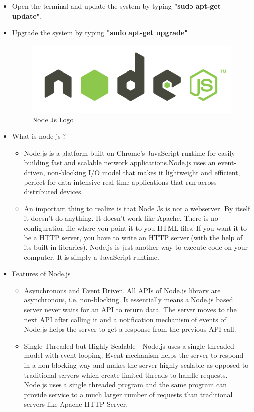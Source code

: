 \documentclass[11pt,a4paper]{article}
\begin{document}
\begin{itemize}
	
	\item Open the terminal and update the system by typing 
	 \textbf{"sudo apt-get update"}.
	 \item Upgrade the system by typing \textbf{ "sudo apt-get upgrade"}
	 \newpage
	 \begin{figure}[h]
    \centering
	\includegraphics[scale=0.5]{nodejs.png}
	\caption {Node Js Logo}
	\end{figure}
	 \item What is node js ?
	 	\begin{itemize}
	 	\item Node.js is a platform built on Chrome's JavaScript runtime for easily building fast and scalable network applications.Node.js uses an event-driven, non-blocking I/O model that makes it lightweight and efficient, perfect for data-intensive real-time applications that run across distributed devices.
	 	\item An important thing to realize is that Node Js is not a webserver. By itself it doesn't do anything. It doesn't work like Apache. There is no configuration file where you point it to you HTML files. If you want it to be a HTTP server, you have to write an HTTP server (with the help of its built-in libraries). Node.js is just another way to execute code on your computer. It is simply a JavaScript runtime.
	 	\end{itemize}
	 
	 	\item Features of Node.js
	 	\begin{itemize}
	 	\item Asynchronous and Event Driven. All APIs of Node.js library are asynchronous, i.e. non-blocking. It essentially means a Node.js based server never waits for an API to return data. The server moves to the next API after calling it and a notification mechanism of events of Node.js helps the server to get a response from the previous API call.

        \item Single Threaded but Highly Scalable - Node.js uses a single threaded model with event looping. Event mechanism helps the server to respond in a non-blocking way and makes the server highly scalable as opposed to traditional servers which create limited threads to handle requests. Node.js uses a single threaded program and the same program can provide service to a much larger number of requests than traditional servers like Apache HTTP Server.


\end{itemize}
\end{itemize}
\end{document}
